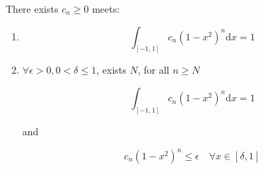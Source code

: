 \begin{thm}
    There exists $c_n \ge 0$ meets:

    \begin{enumerate}
        \item

        \[
            \int_{[-1,1]}c_n(1-x^2)^n \mathrm{d}x = 1
        \]

        \item $\forall \epsilon > 0, 0 < \delta \le 1$, exists $N$, for all $n \ge N$

        \[
            \int_{[-1,1]}c_n(1-x^2)^n \mathrm{d}x = 1
        \]

        and

        \[
            c_n(1-x^2)^n \le \epsilon \quad \forall x \in [\delta, 1]
        \]
        

    \end{enumerate}
\end{thm}

